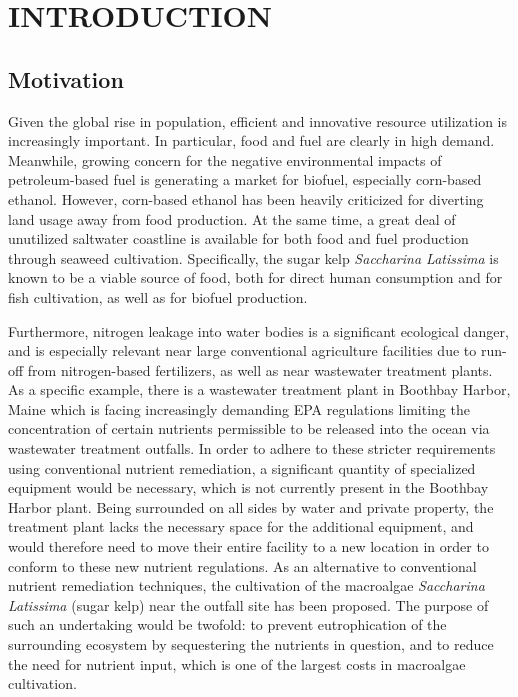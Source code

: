 \chapter{INTRODUCTION} \label{ch:intro}

\section{Motivation}
  Given the global rise in population, efficient and innovative resource utilization is increasingly important.
In particular, food and fuel are clearly in high demand.
Meanwhile, growing concern for the negative environmental impacts of petroleum-based fuel is generating a market for biofuel, especially corn-based ethanol.
However, corn-based ethanol has been heavily criticized for diverting land usage away from food production.
At the same time, a great deal of unutilized saltwater coastline is available for both food and fuel production through seaweed cultivation.
Specifically, the sugar kelp \textit{Saccharina Latissima} is known to be a viable source of food, both for direct human consumption and for fish cultivation, as well as for biofuel production.

Furthermore, nitrogen leakage into water bodies is a significant ecological danger, and is especially relevant near large conventional agriculture facilities due to run-off from nitrogen-based fertilizers, as well as near wastewater treatment plants.
As a specific example, there is a wastewater treatment plant in Boothbay Harbor, Maine which is facing increasingly demanding EPA regulations limiting the concentration of certain nutrients permissible to be released into the ocean via wastewater treatment outfalls.
In order to adhere to these stricter requirements using conventional nutrient remediation, a significant quantity of specialized equipment would be necessary, which is not currently present in the Boothbay Harbor plant.
Being surrounded on all sides by water and private property, the treatment plant lacks the necessary space for the additional equipment, and would therefore need to move their entire facility to a new location in order to conform to these new nutrient regulations.
As an alternative to conventional nutrient remediation techniques, the cultivation of the macroalgae \textit{Saccharina Latissima} (sugar kelp) near the outfall site has been proposed.
The purpose of such an undertaking would be twofold: to prevent eutrophication of the surrounding ecosystem by sequestering the nutrients in question, and to reduce the need for nutrient input, which is one of the largest costs in macroalgae cultivation. %

